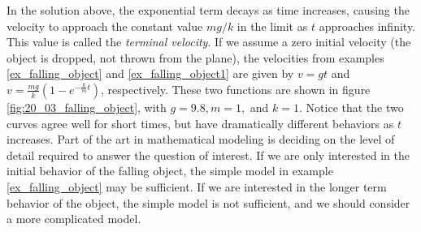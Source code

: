 In the solution above, the exponential term decays as time increases, causing the velocity to approach the constant value $mg/k$ in the limit as $t$ approaches infinity.  This value is called the \emph{terminal velocity}.  If we assume a zero initial velocity (the object is dropped, not thrown from the plane), the velocities from examples \ref{ex_falling_object} and \ref{ex_falling_object1} are given by $v = gt$ and $v = \displaystyle \frac{mg}{k}\left (1 - e^{-\frac{k}{m}t}\right )$, respectively.  These two functions are shown in figure \ref{fig:20_03_falling_object}, with $g = 9.8, m=1,$ and $k=1.$ Notice that the two curves agree well for short times, but have dramatically different behaviors as $t$ increases.  Part of the art in mathematical modeling is deciding on the level of detail required to answer the question of interest.   If we are only interested in the initial behavior of the falling object, the simple model in example \ref{ex_falling_object} may be sufficient.  If we are interested in the longer term behavior of the object, the simple model is not sufficient, and we should consider a more complicated model.



